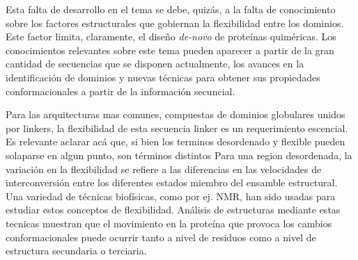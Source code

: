 Esta falta de desarrollo en el tema se debe, quizás, a la falta de conocimiento sobre los factores estructurales que gobiernan la flexibilidad entre los dominios.
Este factor limita, claramente, el diseño \textit{de-novo} de proteínas quiméricas. Los conocimientos relevantes sobre este tema pueden aparecer a partir de la gran cantidad de secuencias que se disponen actualmente, los avances en 
la identificación de dominios y nuevas técnicas para obtener sus propiedades conformacionales a partir de la información secuncial.


Para las arquitecturas mas comunes, compuestas de dominios globulares unidos por linkers, la flexibilidad de esta secuencia linker es un requerimiento escencial.
Es relevante aclarar acá que, si bien los terminos desordenado y flexible pueden solaparse en algun punto, son términos distintos\cite{radivojac2004protein}
Para una region desordenada, la variación en la flexibilidad se refiere a las diferencias en las velocidades de interconversión entre los diferentes estados miembro del ensamble estructural.
Una variedad de técnicas biofísicas, como por ej. NMR, han sido usadas para estudiar estos conceptos de flexibilidad.
Análisis de estructuras mediante estas tecnicas muestran que el movimiento en la proteína que provoca los cambios conformacionales puede ocurrir tanto a nivel de residuos como a nivel de estructura secundaria o terciaria. 


